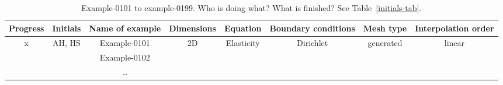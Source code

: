 %
\clearpage
%
\begin{sidewaystable}[h!]
    \centering
    \begin{tabular}{ c | c | c | c | c | c | c | c }
        Progress & Initials & Name of example & Dimensions & Equation & Boundary conditions & Mesh type & Interpolation order \\
        \midrule
        x        & AH, HS   & Example-0101 & 2D & Elasticity & Dirichlet & generated & linear \\
                 &          & Example-0102 &    &            &           &           &        \\
                 &          & \ldots \\
    \end{tabular}
    \caption{Example-0101 to example-0199. Who is doing what? What is finished? See Table~\ref{initials-tab}.}
    \label{progress-x1xx-tab}
\end{sidewaystable}
%
